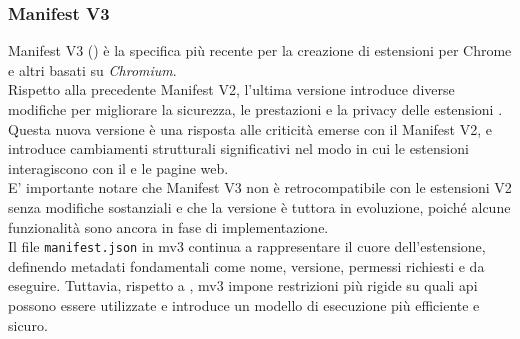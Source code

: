 \subsubsection{Manifest V3}
\label{subsec:mv3}
\noindent Manifest V3 () è la specifica più recente per la creazione di estensioni per Chrome e altri  basati su \textit{Chromium}. \\Rispetto alla precedente Manifest V2, l'ultima versione introduce diverse modifiche per migliorare la sicurezza, le prestazioni e la privacy delle estensioni \cite{site:mv3-chrome}. \\
Questa nuova versione è una risposta alle criticità emerse con il Manifest V2, e introduce cambiamenti strutturali significativi nel modo in cui le estensioni interagiscono con il  e le pagine web.\\
E' importante notare che Manifest V3 non è retrocompatibile con le estensioni V2 senza modifiche sostanziali e che la versione è tuttora in evoluzione, poiché alcune funzionalità sono ancora in fase di implementazione.\\
Il file \texttt{manifest.json} in \acrshort{mv3} continua a rappresentare il cuore dell’estensione, definendo metadati fondamentali come nome, versione, permessi richiesti e  da eseguire. Tuttavia, rispetto a , \acrshort{mv3} impone restrizioni più rigide su quali \acrshort{api} possono essere utilizzate e introduce un modello di esecuzione più efficiente e sicuro.\\

